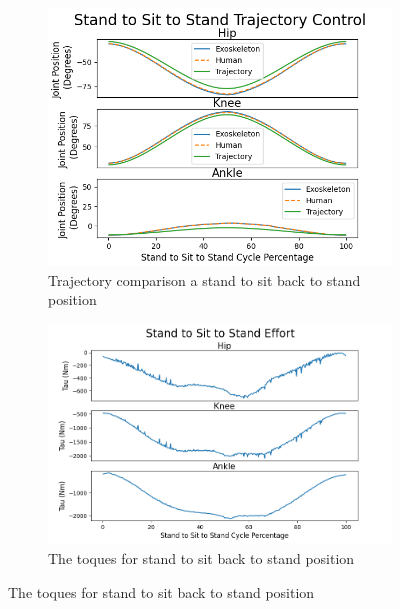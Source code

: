  
 
  \begin{figure}[h!]
    \begin{subfigure}{0.5\textwidth}
        \centering
        \captionsetup{width=.8\linewidth}%
        \includegraphics[width=\textwidth]{images/sim/standsitstandjoints (1).png}
        \caption{Trajectory comparison a stand to sit back to stand position}
        \label{fig:simsit2standTraj}
    \end{subfigure}
    \begin{subfigure}{0.5\textwidth}
        \centering
        \captionsetup{width=.8\linewidth}%
        \includegraphics[width=\textwidth]{images/sim/standsitstandtau.png}
        \caption{The toques for stand to sit back to stand position }

\end{subfigure}
\end{figure}
